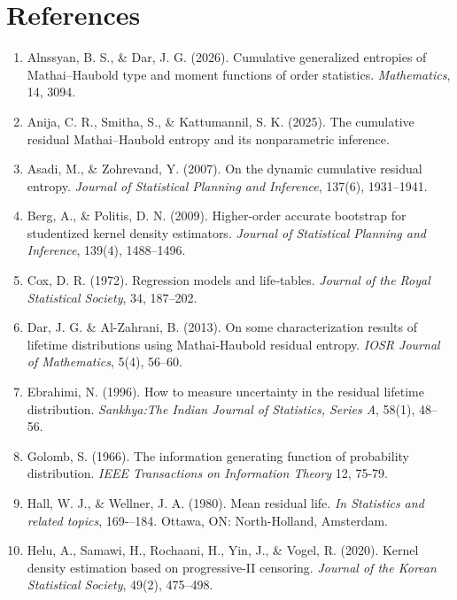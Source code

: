 \documentclass[11pt,reqno]{amsart}
\theoremstyle{tight}
\begin{document}
\section{References}
\begin{enumerate}

\item Alnssyan, B. S., \& Dar, J. G. (2026). Cumulative generalized entropies of Mathai--Haubold type and moment functions of order statistics. \textit{Mathematics}, 14, 3094.
\item Anija, C. R., Smitha, S., \& Kattumannil, S. K. (2025).
The cumulative residual Mathai--Haubold entropy and its nonparametric inference.
\item Asadi, M., \& Zohrevand, Y. (2007). On the dynamic cumulative residual entropy. \textit{Journal of Statistical Planning and Inference}, 137(6), 1931--1941.
\item Berg, A., \& Politis, D. N. (2009). Higher-order accurate bootstrap for studentized kernel density estimators. \textit{Journal of Statistical Planning and Inference}, 139(4), 1488--1496.
\item Cox, D. R. (1972). Regression models and life‐tables. \textit{Journal of the Royal Statistical Society}, 34, 187--202.
\item Dar, J. G. \& Al-Zahrani, B. (2013). On some characterization results of lifetime distributions using Mathai-Haubold residual entropy. \textit{IOSR Journal of Mathematics}, 5(4), 56--60.
\item Ebrahimi, N. (1996). How to measure uncertainty in  the residual lifetime distribution. \textit{Sankhya:The Indian Journal of Statistics, Series A}, 58(1), 48--56.
\item Golomb, S. (1966). The information generating function of probability distribution. \textit{IEEE Transactions on Information Theory} 12, 75-79.
\item Hall, W. J., \& Wellner, J. A. (1980). Mean residual life. \textit{In Statistics and related topics}, 169-–184. Ottawa, ON: North-Holland, Amsterdam.
\item Helu, A., Samawi, H., Rochaani, H., Yin, J., \& Vogel, R. (2020). Kernel density estimation based on progressive-II censoring. \textit{Journal of the Korean Statistical Society}, 49(2), 475--498.

\end{enumerate}
\end{document}
